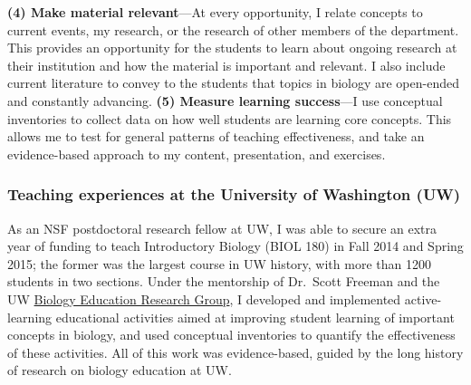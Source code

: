 \textbf{(4) Make material relevant}---At every opportunity, I relate concepts
to current events, my research, or the research of other members of the
department.
This provides an opportunity for the students to learn about ongoing
research at their institution and how the material is important and relevant.
I also include current literature to convey to the students that topics in
biology are open-ended and constantly advancing.
\textbf{(5) Measure learning success}---I use conceptual inventories to
collect
data on how well students are learning core concepts.
This allows me to test for general patterns of teaching effectiveness, and take
an evidence-based approach to my content, presentation, and exercises.

\subsubsection*{Teaching experiences at the University of Washington (UW)}
As an NSF postdoctoral research fellow at UW,
I was able to secure an extra year of funding to teach
Introductory Biology
(BIOL 180) in Fall 2014 and Spring 2015;
the former was the largest course in UW history, with more than 1200 students
in two sections.
Under the mentorship of Dr.\ Scott Freeman and the UW
\href{https://sites.google.com/site/uwbioedresgroup/home}{Biology Education
    Research Group}, I developed and implemented active-learning
educational activities aimed at improving student learning of important
concepts in biology,
and used conceptual inventories to quantify the effectiveness of these
activities.
All of this work was evidence-based, guided by the long history of research on
biology education at UW.

